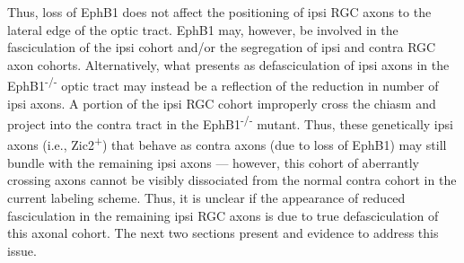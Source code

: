 Thus, loss of EphB1 does not affect the positioning of ipsi RGC axons to the lateral edge of the optic tract.
EphB1 may, however, be involved in the fasciculation of the ipsi cohort and/or the segregation of ipsi and contra RGC axon cohorts.
Alternatively, what presents as defasciculation of ipsi axons in the EphB1\textsuperscript{-/-} optic tract may instead be a reflection of the reduction in number of ipsi axons.
A portion of the ipsi RGC cohort improperly cross the chiasm and project into the contra tract in the EphB1\textsuperscript{-/-} mutant.
Thus, these genetically ipsi axons (i.e., Zic2\textsuperscript{+}) that behave as contra axons (due to loss of EphB1) may still bundle with the remaining ipsi axons --- however, this cohort of aberrantly crossing axons cannot be visibly dissociated from the normal contra cohort in the current labeling scheme.
Thus, it is unclear if the appearance of reduced fasciculation in the remaining ipsi RGC axons is due to true defasciculation of this axonal cohort.
The next two sections present \invivo{} and \invitro{} evidence to address this issue.
